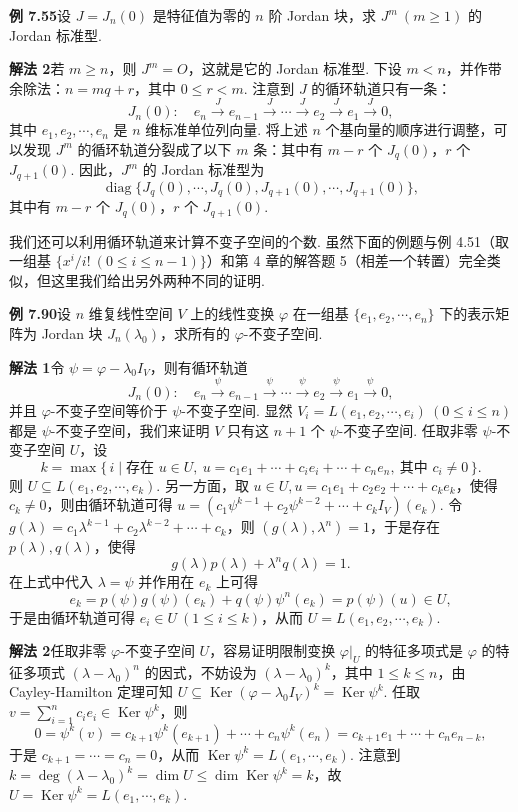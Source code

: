 \documentclass[UTF8,12pt,a4paper,fontset=fandol]{ctexart}
\begin{document}
\noindent\textbf{例 7.55}\quad 设 $J=J_n(0)$ 是特征值为零的 $n$ 阶 Jordan 块，求 $J^m\ (m\ge1)$ 的 Jordan 标准型.

\noindent\textbf{解法 2}\quad 若 $m\ge n$，则 $J^m=O$，这就是它的 Jordan 标准型. 下设 $m<n$，并作带余除法：$n=mq+r$，其中 $0\le r<m$. 注意到 $J$ 的循环轨道只有一条：
\[
J_n(0):\quad e_n\xrightarrow{J}e_{n-1}\xrightarrow{J}\cdots\xrightarrow{J}e_2\xrightarrow{J}e_1\xrightarrow{J}0,
\]
其中 $e_1,e_2,\cdots,e_n$ 是 $n$ 维标准单位列向量. 将上述 $n$ 个基向量的顺序进行调整，可以发现 $J^m$ 的循环轨道分裂成了以下 $m$ 条：其中有 $m-r$ 个 $J_q(0)$，$r$ 个 $J_{q+1}(0)$. 因此，$J^m$ 的 Jordan 标准型为
\[
\operatorname{diag}\{J_q(0),\cdots,J_q(0),J_{q+1}(0),\cdots,J_{q+1}(0)\},
\]
其中有 $m-r$ 个 $J_q(0)$，$r$ 个 $J_{q+1}(0)$.

我们还可以利用循环轨道来计算不变子空间的个数. 虽然下面的例题与例 4.51（取一组基 $\{x^i/i!\ (0\le i\le n-1)\}$）和第 4 章的解答题 5（相差一个转置）完全类似，但这里我们给出另外两种不同的证明.

\noindent\textbf{例 7.90}\quad 设 $n$ 维复线性空间 $V$ 上的线性变换 $\varphi$ 在一组基 $\{e_1,e_2,\cdots,e_n\}$ 下的表示矩阵为 Jordan 块 $J_n(\lambda_0)$，求所有的 $\varphi$-不变子空间.

\noindent\textbf{解法 1}\quad 令 $\psi=\varphi-\lambda_0I_V$，则有循环轨道
\[
J_n(0):\quad e_n\xrightarrow{\psi}e_{n-1}\xrightarrow{\psi}\cdots\xrightarrow{\psi}e_2\xrightarrow{\psi}e_1\xrightarrow{\psi}0,
\]
并且 $\varphi$-不变子空间等价于 $\psi$-不变子空间. 显然 $V_i=L(e_1,e_2,\cdots,e_i)\ (0\le i\le n)$ 都是 $\psi$-不变子空间，我们来证明 $V$ 只有这 $n+1$ 个 $\psi$-不变子空间. 任取非零 $\psi$-不变子空间 $U$，设
\[
k=\max\{\,i\mid \text{存在 }u\in U,\ u=c_1e_1+\cdots+c_ie_i+\cdots+c_ne_n,\ \text{其中 }c_i\ne0\,\}.
\]
则 $U\subseteq L(e_1,e_2,\cdots,e_k)$. 另一方面，取 $u\in U,u=c_1e_1+c_2e_2+\cdots+c_ke_k$，使得 $c_k\ne0$，则由循环轨道可得 $u=(c_1\psi^{k-1}+c_2\psi^{k-2}+\cdots+c_kI_V)(e_k)$. 令 $g(\lambda)=c_1\lambda^{k-1}+c_2\lambda^{k-2}+\cdots+c_k$，则 $(g(\lambda),\lambda^n)=1$，于是存在 $p(\lambda),q(\lambda)$，使得
\[
g(\lambda)p(\lambda)+\lambda^nq(\lambda)=1.
\]
在上式中代入 $\lambda=\psi$ 并作用在 $e_k$ 上可得
\[
e_k=p(\psi)g(\psi)(e_k)+q(\psi)\psi^n(e_k)=p(\psi)(u)\in U,
\]
于是由循环轨道可得 $e_i\in U\ (1\le i\le k)$，从而 $U=L(e_1,e_2,\cdots,e_k)$.

\noindent\textbf{解法 2}\quad 任取非零 $\varphi$-不变子空间 $U$，容易证明限制变换 $\varphi|_U$ 的特征多项式是 $\varphi$ 的特征多项式 $(\lambda-\lambda_0)^n$ 的因式，不妨设为 $(\lambda-\lambda_0)^k$，其中 $1\le k\le n$，由 Cayley-Hamilton 定理可知 $U\subseteq\operatorname{Ker}(\varphi-\lambda_0I_V)^k=\operatorname{Ker}\psi^k$. 任取 $v=\sum_{i=1}^nc_ie_i\in\operatorname{Ker}\psi^k$，则
\[
0=\psi^k(v)=c_{k+1}\psi^k(e_{k+1})+\cdots+c_n\psi^k(e_n)=c_{k+1}e_1+\cdots+c_ne_{n-k},
\]
于是 $c_{k+1}=\cdots=c_n=0$，从而 $\operatorname{Ker}\psi^k=L(e_1,\cdots,e_k)$. 注意到 $k=\deg(\lambda-\lambda_0)^k=\dim U\le\dim\operatorname{Ker}\psi^k=k$，故 $U=\operatorname{Ker}\psi^k=L(e_1,\cdots,e_k)$.
\end{document}
